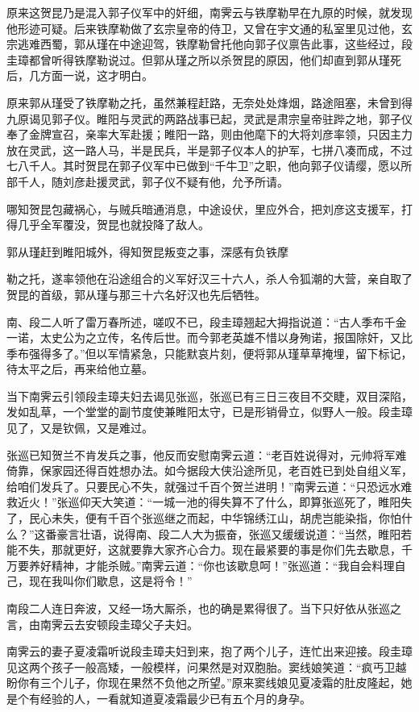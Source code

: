 \documentclass[12pt,oneside]{book}
\begin{document}
原来这贺昆乃是混入郭子仪军中的奸细，南霁云与铁摩勒早在九原的时候，就发现他形迹可疑。后来铁摩勒做了玄宗皇帝的侍卫，又曾在宇文通的私室里见过他，玄宗逃难西蜀，郭从瑾在中途迎驾，铁摩勒曾托他向郭子仪禀告此事，这些经过，段圭璋都曾听得铁摩勒说过。但郭从瑾之所以杀贺昆的原因，他们却直到郭从瑾死后，几方面一说，这才明白。

原来郭从瑾受了铁摩勒之托，虽然兼程赶路，无奈处处烽烟，路途阻塞，未曾到得九原谒见郭子仪。睢阳与灵武的两路战事已起，灵武是肃宗皇帝驻跸之地，郭子仪奉了金牌宣召，亲率大军赴援；睢阳一路，则由他麾下的大将刘彦率领，只因主力放在灵武，这一路人马，半是民兵，半是郭子仪本人的护军，七拼八凑而成，不过七八千人。其时贺昆在郭子仪军中已做到``千牛卫''之职，他向郭子仪请缨，愿以所部千人，随刘彦赴援灵武，郭子仪不疑有他，允予所请。

哪知贺昆包藏祸心，与贼兵暗通消息，中途设伏，里应外合，把刘彦这支援军，打得几乎全军覆没，贺昆也就投降了敌人。

郭从瑾赶到睢阳城外，得知贺昆叛变之事，深感有负铁摩

勒之托，遂率领他在沿途组合的义军好汉三十六人，杀人令狐潮的大营，亲自取了贺昆的首级，郭从瑾与那三十六名好汉也先后牺牲。

南、段二人听了雷万春所述，嗟叹不已，段圭璋翘起大拇指说道：``古人季布千金一诺，太史公为之立传，名传后世。而今郭老英雄不惜以身殉诺，报国除奸，又比季布强得多了。''但以军情紧急，只能默哀片刻，便将郭从瑾草草掩埋，留下标记，待太平之后，再来给他立墓。

当下南霁云引领段圭璋夫妇去谒见张巡，张巡已有三日三夜目不交睫，双目深陷，发如乱草，一个堂堂的副节度使兼睢阳太守，已是形销骨立，似野人一般。段圭璋见了，又是钦佩，又是难过。

张巡已知贺兰不肯发兵之事，他反而安慰南霁云道：``老百姓说得对，元帅将军难倚靠，保家园还得百姓想办法。如今据段大侠沿途所见，老百姓已到处自组义军，给咱们发兵了。只要民心不失，就强过千百个贺兰进明！''南霁云道：``只恐远水难救近火！''张巡仰天大笑道：``一城一池的得失算不了什么，即算张巡死了，睢阳失了，民心未失，便有千百个张巡继之而起，中华锦绣江山，胡虎岂能染指，你怕什么？''这番豪言壮语，说得南、段二人大为振奋，张巡又缓缓说道：``当然，睢阳若能不失，那就更好，这就要靠大家齐心合力。现在最紧要的事是你们先去歇息，千万要养好精神，才能杀贼。''南霁云道：``你也该歇息呵！''张巡道：``我自会料理自己，现在我叫你们歇息，这是将令！''

南段二人连日奔波，又经一场大厮杀，也的确是累得很了。当下只好依从张巡之言，由南霁云去安顿段圭璋父子夫妇。

南霁云的妻子夏凌霜听说段圭璋夫妇到来，抱了两个儿子，连忙出来迎接。段圭璋见这两个孩子一般高矮，一般模样，问果然是对双胞胎。窦线娘笑道：``疯丐卫越盼你有三个儿子，你现在果然不负他之所望。''原来窦线娘见夏凌霜的肚皮隆起，她是个有经验的人，一看就知道夏凌霜最少已有五个月的身孕。
\end{document}
